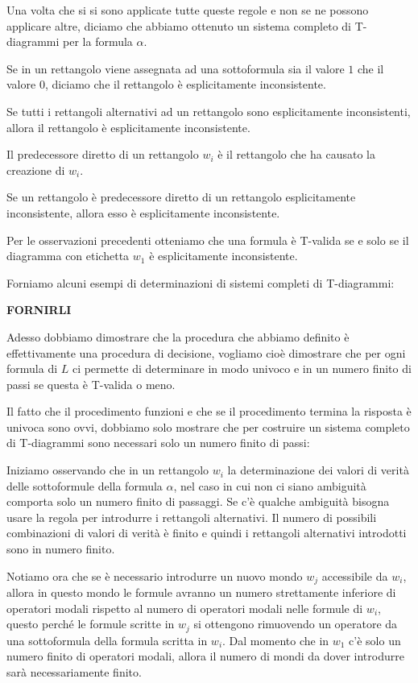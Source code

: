 \documentclass[a4paper, 12pt]{article}
\begin{document}
Una volta che si si sono applicate tutte queste regole e non se ne possono applicare altre,
diciamo che abbiamo ottenuto un sistema completo di T-diagrammi per la formula $\alpha$.

Se in un rettangolo viene assegnata ad una sottoformula sia il valore $1$ che il valore $0$,
diciamo che il rettangolo è esplicitamente inconsistente.

Se tutti i rettangoli alternativi ad un rettangolo sono esplicitamente inconsistenti,
allora il rettangolo è esplicitamente inconsistente.

Il predecessore diretto di un rettangolo $w_i$ è il rettangolo che ha causato
la creazione di $w_i$.

Se un rettangolo è predecessore diretto di un rettangolo esplicitamente inconsistente,
allora esso è esplicitamente inconsistente.

Per le osservazioni precedenti otteniamo che una formula è T-valida
se e solo se il diagramma con etichetta $w_1$ è esplicitamente inconsistente.

Forniamo alcuni esempi di determinazioni di sistemi completi di T-diagrammi:

\textbf{FORNIRLI}


Adesso dobbiamo dimostrare che la procedura che abbiamo definito è effettivamente
una procedura di decisione, vogliamo cioè dimostrare che per ogni formula di $L$
ci permette di determinare in modo univoco e in un numero finito di passi
se questa è T-valida o meno.

Il fatto che il procedimento funzioni e che se il procedimento termina la risposta è univoca
sono ovvi, dobbiamo solo mostrare che per costruire un sistema completo di T-diagrammi
sono necessari solo un numero finito di passi:

Iniziamo osservando che in un rettangolo $w_i$
la determinazione dei valori di verità delle sottoformule della formula $\alpha$,
nel caso in cui non ci siano ambiguità comporta solo un numero finito di passaggi.
Se c'è qualche ambiguità bisogna usare la regola per introdurre i rettangoli alternativi.
Il numero di possibili combinazioni di valori di verità è finito e quindi
i rettangoli alternativi introdotti sono in numero finito.

Notiamo ora che se è necessario introdurre un nuovo mondo $w_j$ accessibile da $w_i$,
allora in questo mondo le formule avranno un numero strettamente inferiore di operatori
modali rispetto al numero di operatori modali nelle formule di $w_i$, questo perché
le formule scritte in $w_j$ si ottengono rimuovendo un operatore da una sottoformula
della formula scritta in $w_i$.
Dal momento che in $w_1$ c'è solo un numero finito di operatori
modali, allora il numero di mondi da dover introdurre sarà necessariamente finito.
\end{document}
